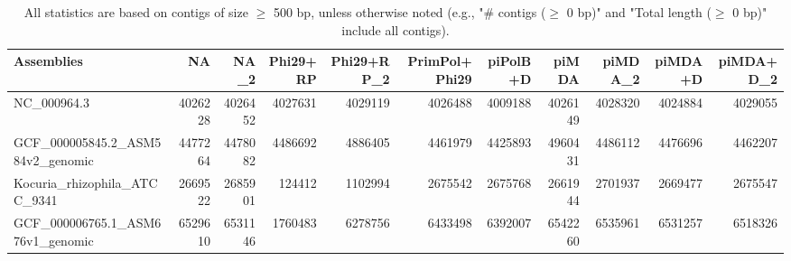 \documentclass[12pt,a4paper]{article}
\begin{document}
\begin{table}[ht]
\begin{center}
\caption{All statistics are based on contigs of size $\geq$ 500 bp, unless otherwise noted (e.g., "\# contigs ($\geq$ 0 bp)" and "Total length ($\geq$ 0 bp)" include all contigs).}
\begin{tabular}{|l*{10}{|r}|}
\hline
Assemblies & NA & NA\_2 & Phi29+RP & Phi29+RP\_2 & PrimPol+Phi29 & piPolB+D & piMDA & piMDA\_2 & piMDA+D & piMDA+D\_2 \\ \hline
NC\_000964.3 & 4026228 & 4026452 & 4027631 & 4029119 & 4026488 & 4009188 & 4026149 & 4028320 & 4024884 & 4029055 \\ \hline
GCF\_000005845.2\_ASM584v2\_genomic & 4477264 & 4478082 & 4486692 & 4886405 & 4461979 & 4425893 & 4960431 & 4486112 & 4476696 & 4462207 \\ \hline
Kocuria\_rhizophila\_ATCC\_9341 & 2669522 & 2685901 & 124412 & 1102994 & 2675542 & 2675768 & 2661944 & 2701937 & 2669477 & 2675547 \\ \hline
GCF\_000006765.1\_ASM676v1\_genomic & 6529610 & 6531146 & 1760483 & 6278756 & 6433498 & 6392007 & 6542260 & 6535961 & 6531257 & 6518326 \\ \hline
\end{tabular}
\end{center}
\end{table}
\end{document}
